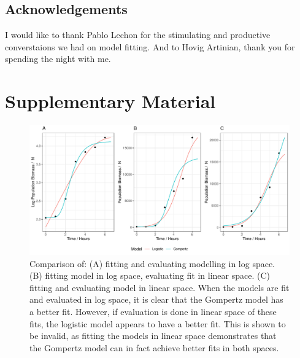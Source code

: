 \documentclass[11pt, a4paper]{article}
\newcommand{\beginsupplement}{%
        \setcounter{table}{0}
        \renewcommand{\thetable}{S\arabic{table}}%
        \setcounter{figure}{0}
        \renewcommand{\thefigure}{S\arabic{figure}}%
     }
\begin{document}
\begin{linenumbers}
\section{Acknowledgements}
I would like to thank Pablo Lechon for the stimulating and productive converstaions we had on model fitting. And to Hovig Artinian, thank you for spending the night with me. 
\end{linenumbers}

\section{Supplementary Material}
\beginsupplement

        \begin{figure}[H]
        \includegraphics[width=\linewidth]{../results/compare_log_lin_fit.pdf}
        \captionsetup{format=hang}
        \caption{Comparison of: (A) fitting and evaluating modelling in log space. (B) fitting model in log space, evaluating fit in linear space. (C) fitting and evaluating model in linear space. \newline When the models are fit and evaluated in log space, it is clear that the Gompertz model has a better fit. However, if evaluation is done in linear space of these fits, the logistic model appears to have a better fit. This is shown to be invalid, as fitting the models in linear space demonstrates that the Gompertz model can in fact achieve better fits in both spaces.  }
        \label{sup:compare_least_squares}
        \end{figure}
        
\end{document}
